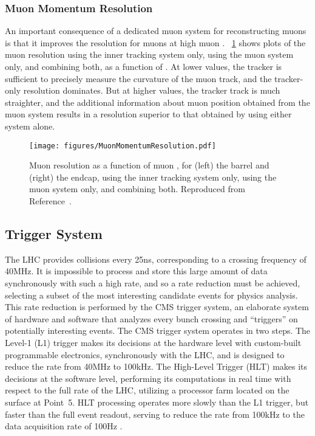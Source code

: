 \subsubsection{Muon Momentum Resolution}
An important consequence of a dedicated muon system for reconstructing muons is that it improves the \pT resolution for muons at high muon \pT.
\Fig~\ref{cms:muonpT} shows plots of the muon \pT resolution using the inner tracking system only, using the muon system only, and combining both, as a function of \pT.
At lower \pT values, the tracker is sufficient to precisely measure the curvature of the muon track, and the tracker-only resolution dominates.
But at higher \pT values, the tracker track is much straighter, and the additional information about muon position obtained from the muon system results in a \pT resolution superior to that obtained by using either system alone.

\begin{figure}[tpb]
  \centering
  \texttt{[image: figures/MuonMomentumResolution.pdf]}
  \caption{Muon \pT resolution as a function of muon \pT, for (left) the barrel and (right) the endcap, using the inner tracking system only, using the muon system only, and combining both. Reproduced from Reference~\cite{Chatrchyan:2008zzk}.}
  \label{cms:muonpT}
\end{figure}

\subsection{Trigger System}
\label{cms:trigger}
The LHC provides \pp collisions every 25\unit{ns}, corresponding to a crossing frequency of 40\unit{MHz}.
It is impossible to process and store this large amount of data synchronously with such a high rate, and so a rate reduction must be achieved, selecting a subset of the most interesting candidate events for physics analysis.
This rate reduction is performed by the CMS trigger system, an elaborate system of hardware and software that analyzes every bunch crossing and ``triggers'' on potentially interesting events.
The CMS trigger system operates in two steps.
The Level-1 (L1) trigger makes its decisions at the hardware level with custom-built programmable electronics, synchronously with the LHC, and is designed to reduce the rate from 40\unit{MHz} to 100\unit{kHz}.
The High-Level Trigger (HLT) makes its decisions at the software level, performing its computations in real time with respect to the full rate of the LHC, utilizing a processor farm located on the surface at Point~5.
HLT processing operates more slowly than the L1 trigger, but faster than the full event readout, serving to reduce the rate from 100\unit{kHz} to the data acquisition rate of 100\unit{Hz} \cite{Chatrchyan:2008zzk, Adam:2005zf}.

